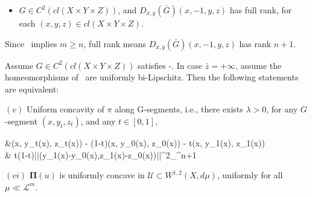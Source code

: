 \begin{itemize}
	\item[\Gsix] $G\in C^2(cl(X\times Y \times Z)
	)$, and $D_{\bar{x},\bar{y}}(\bar{G})(x,-1,y,z)$ has full rank, for each $(x,y,z)\in cl(X\times Y\times Z)$. 
\end{itemize}

Since \Gone\ implies $m \ge n$,  full rank means $D_{\bar{x},\bar{y}}(\bar{G})(x,-1,y,z)$ has rank $n+1$.
\medskip


\begin{theorem}\label{maintheorem2}
	Assume $G\in  C^{2}(cl(X\times Y\times Z))$ satisfies \Gzero-{\Gsix}. In case $\bar{z}=+\infty$, assume the homeomorphisms of \Gone\ are uniformly bi-Lipschitz. Then the following statements are equivalent:
	
	$(v)$ Uniform concavity of $\pi$ along G-segments, i.e., there exists $\lambda>0$, for any $G$-segment $(x, y_t, z_t)$, and any $t\in [0,1]$, 
	\begin{flalign}\label{uniformconvavity}
	\begin{split}
	&\pi(x, y_t(x), z_t(x)) - (1-t)\pi(x, y_0(x), z_0(x)) - t\pi(x, y_1(x), z_1(x)) \\
	\ge & t(1-t)\lambda||(y_1(x)-y_0(x),z_1(x)-z_0(x))||^2_{\R^{n+1}}
	\end{split}
	\end{flalign} 
	
	$(vi)$ $\pmb \Pi(u)$ is uniformly concave in $\mathcal{U} \subset W^{1,2}(X,d\mu)$,  uniformly for all $\mu\ll \mathcal{L}^m$. 
\end{theorem}

